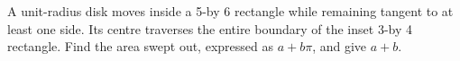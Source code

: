 A unit-radius disk moves inside a 5-by 6 rectangle while remaining tangent to at least one side. Its centre traverses the entire boundary of the inset 3-by 4 rectangle. Find the area swept out, expressed as $a+b\pi$, and give $a+b$.
